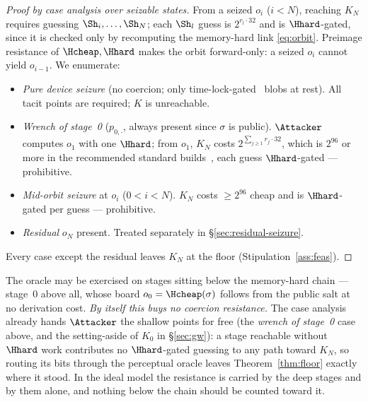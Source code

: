 \begin{proof}[Proof by case analysis over seizable states]
From a seized $o_i$ ($i < N$), reaching $K_N$ requires guessing
$\Sh_i, \dots, \Sh_N$; each $\Sh_l$ guess is $2^{r_l \cdot 32}$ and is
$\Hhard$-gated, since it is checked only by recomputing the memory-hard link
\eqref{eq:orbit}. Preimage resistance of $\Hcheap, \Hhard$ makes the orbit
forward-only: a seized $o_i$ cannot yield $o_{i-1}$. We enumerate:
\begin{itemize}[nosep,leftmargin=1.4em]
  \item \emph{Pure device seizure} (no coercion; only time-lock-gated~\cite{rsw1996}
        blobs at rest). All tacit points are required; $K$ is unreachable.
  \item \emph{Wrench of stage~0} ($p_{0,\cdot}$, always present since $\sigma$ is
        public). $\Attacker$ computes $o_1$ with one $\Hhard$; from $o_1$, $K_N$
        costs $2^{\sum_{j\ge 1} r_j\cdot 32}$, which is $2^{96}$ or more in the
        recommended standard builds~\cite{gw-design}, each guess $\Hhard$-gated ---
        prohibitive.
  \item \emph{Mid-orbit seizure} at $o_i$ ($0 < i < N$). $K_N$ costs $\ge 2^{96}$
        cheap and is $\Hhard$-gated per guess --- prohibitive.
  \item \emph{Residual} $o_N$ present. Treated separately in
        \S\ref{sec:residual-seizure}.
\end{itemize}
Every case except the residual leaves $K_N$ at the floor
(Stipulation~\ref{ass:feas}).
\end{proof}

\begin{remark}
\label{rem:shallow-null}
The oracle may be exercised on stages sitting below the memory-hard chain ---
stage~$0$ above all, whose board $o_0 = \Hcheap(\sigma)$ follows from the public
salt at no derivation cost. \emph{By itself this buys no coercion resistance.}
The case analysis already hands $\Attacker$ the shallow points for free (the
\emph{wrench of stage~0} case above, and the setting-aside of $K_0$ in
\S\ref{sec:gw}): a stage reachable without $\Hhard$ work contributes no
$\Hhard$-gated guessing to any path toward $K_N$, so routing its bits through the
perceptual oracle leaves Theorem~\ref{thm:floor} exactly where it stood. In the
ideal model the resistance is carried by the deep stages and by them alone, and
nothing below the chain should be counted toward it.
\end{remark}

